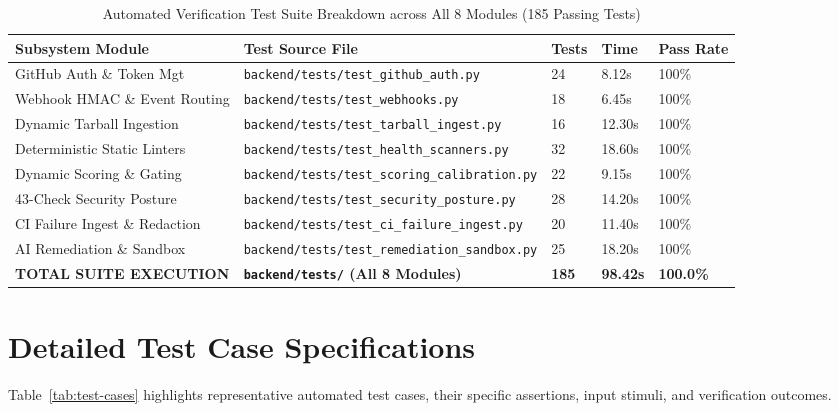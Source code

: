 \begin{table}[htbp]
    \centering
    \caption{Automated Verification Test Suite Breakdown across All 8 Modules (185 Passing Tests)}
    \label{tab:test-breakdown}
    \small
    \begin{tabularx}{\textwidth}{p{} p{} p{} p{} p{}}
        \toprule
        \textbf{Subsystem Module} & \textbf{Test Source File} & \textbf{Tests} & \textbf{Time} & \textbf{Pass Rate} \\
        \midrule
        GitHub Auth \& Token Mgt & \texttt{backend/tests/test\_github\_auth.py} & 24 & 8.12s & 100\% \\
        Webhook HMAC \& Event Routing & \texttt{backend/tests/test\_webhooks.py} & 18 & 6.45s & 100\% \\
        Dynamic Tarball Ingestion & \texttt{backend/tests/test\_tarball\_ingest.py} & 16 & 12.30s & 100\% \\
        Deterministic Static Linters & \texttt{backend/tests/test\_health\_scanners.py} & 32 & 18.60s & 100\% \\
        Dynamic Scoring \& Gating & \texttt{backend/tests/test\_scoring\_calibration.py} & 22 & 9.15s & 100\% \\
        43-Check Security Posture & \texttt{backend/tests/test\_security\_posture.py} & 28 & 14.20s & 100\% \\
        CI Failure Ingest \& Redaction & \texttt{backend/tests/test\_ci\_failure\_ingest.py} & 20 & 11.40s & 100\% \\
        AI Remediation \& Sandbox & \texttt{backend/tests/test\_remediation\_sandbox.py} & 25 & 18.20s & 100\% \\
        \midrule
        \textbf{TOTAL SUITE EXECUTION} & \textbf{\texttt{backend/tests/} (All 8 Modules)} & \textbf{185} & \textbf{98.42s} & \textbf{100.0\%} \\
        \bottomrule
    \end{tabularx}
\end{table}

\section{Detailed Test Case Specifications}
\label{sec:test-cases}

Table~\ref{tab:test-cases} highlights representative automated test cases, their specific assertions, input stimuli, and verification outcomes.

